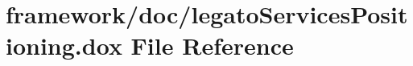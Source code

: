 \hypertarget{legato_services_positioning_8dox}{}\section{framework/doc/legato\+Services\+Positioning.dox File Reference}
\label{legato_services_positioning_8dox}
